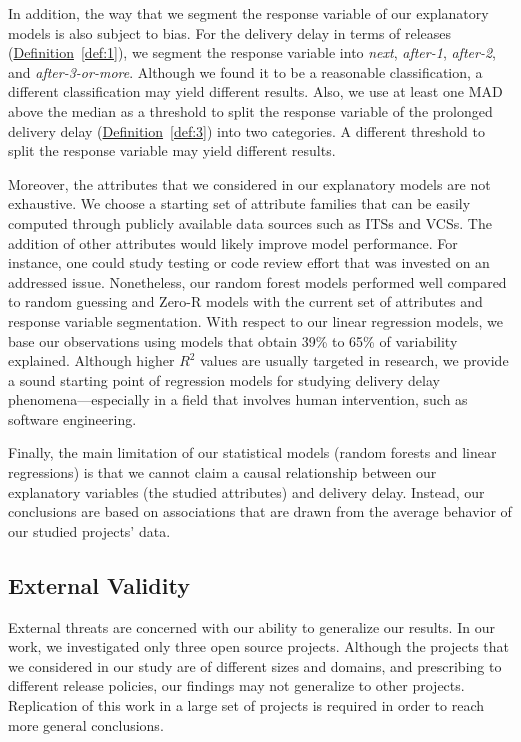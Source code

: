 In addition, the way that we segment the response variable of our explanatory
models is also subject to bias. For the delivery delay in terms of releases
(\hyperref[def:1]{Definition}~\ref{def:1}), we segment the response variable
into \textit{next}, \textit{after-1}, \textit{after-2}, and
\textit{after-3-or-more}. Although we found it to be a reasonable
classification, a different classification may yield different results. Also, we
use at least one MAD above the median as a threshold to split the response
variable of the prolonged delivery delay
(\hyperref[def:3]{Definition}~\ref{def:3}) into two categories. A different
threshold to split the response variable may yield different results.

Moreover, the attributes that we considered in our explanatory models are not
exhaustive. We choose a starting set of attribute families that can be easily
computed through publicly available data sources such as ITSs and VCSs. The
addition of other attributes would likely improve model performance. For
instance, one could study testing or code review effort that was
invested on an addressed issue. Nonetheless, our random forest models performed well
compared to random guessing and Zero-R models with the current set of attributes
and response variable segmentation. With respect to our linear regression
models, we base our observations using models that obtain 39\% to 65\% of
variability explained. Although higher $R^2$ values are usually targeted in
research, we provide a sound starting point of regression models for studying
delivery delay phenomena---especially in a field that involves human
intervention, such as software engineering.

Finally, the main limitation of our statistical models (\ie random forests and
linear regressions) is that we cannot claim a causal relationship between our
explanatory variables (\ie the studied attributes) and delivery delay.
Instead, our conclusions are based on associations that are drawn from the
average behavior of our studied projects' data.

\subsection{External Validity}
External threats are concerned with our ability to generalize our results. In
our work, we investigated only three open source projects. Although the projects
that we considered in our study are of different sizes and domains, and
prescribing to different release policies, our findings may not generalize to
other projects. Replication of this work in a large set of projects is required
in order to reach more general conclusions.

